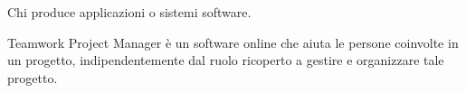 
Chi produce applicazioni o sistemi software. \\



Teamwork Project Manager è un software online che aiuta le persone coinvolte in un progetto, indipendentemente dal ruolo ricoperto a gestire e organizzare tale progetto. \\








\appendix
%


